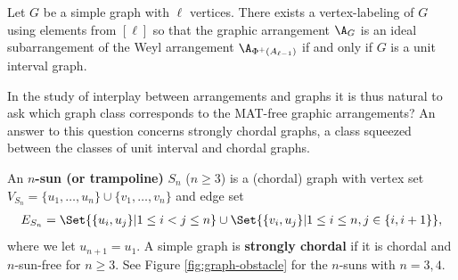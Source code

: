  \begin{theorem}
\label{thm:ideal-UI}
Let $G$ be a simple graph with $\ell$ vertices. 
There exists a vertex-labeling of $G$ using elements from $[\ell]$ so that the graphic arrangement $\A_G$ is an ideal subarrangement of the Weyl arrangement $\A_{\Phi^+(A_{\ell-1})}$ if and only if $G$ is a unit interval graph.
\end{theorem}

In the study of interplay between arrangements and graphs it is thus natural to ask which graph class corresponds to the MAT-free graphic arrangements? 
An answer to this question concerns strongly chordal graphs, a class squeezed between the classes of unit interval and chordal graphs.
\begin{definition}
\label{def:strongly-chordal}
An \textbf{$n$-sun (or trampoline)} $ S_{n} $ ($n \ge 3$) is a (chordal) graph with vertex set $V_{S_{n}} = \{u_{1}, \dots, u_{n}\} \cup \{v_{1}, \dots, v_{n}\} $ and edge set 
\begin{align*}
E_{S_{n}} = \Set{\{u_{i},u_{j}\} | 1 \leq i < j \leq n} \cup \Set{\{v_{i}, u_{j}\} | 1 \leq i \leq n, j \in \{i, i+1\}}, 
\end{align*}
where we let $ u_{n+1} = u_{1} $. 
 A simple graph is  \textbf{strongly chordal} if it is chordal and $n$-sun-free for $n\ge3$. 
 See Figure \ref{fig:graph-obstacle} for the $n$-suns with $n=3,4$.
\end{definition}

